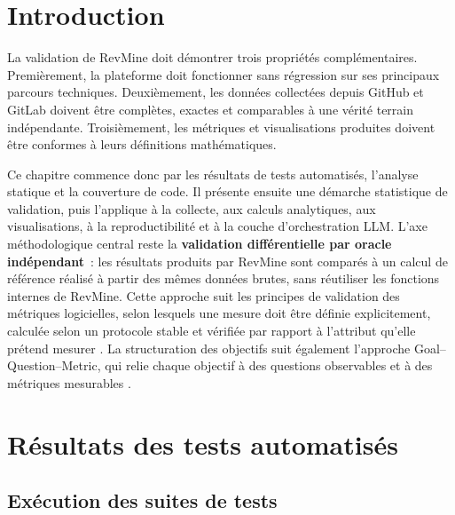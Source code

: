 

\section{Introduction}
\label{sec:validation-introduction}

La validation de RevMine doit démontrer trois propriétés complémentaires. Premièrement, la
plateforme doit fonctionner sans régression sur ses principaux parcours techniques. Deuxièmement,
les données collectées depuis GitHub et GitLab doivent être complètes, exactes et comparables à
une vérité terrain indépendante. Troisièmement, les métriques et visualisations produites doivent
être conformes à leurs définitions mathématiques.

Ce chapitre commence donc par les résultats de tests automatisés, l'analyse statique et la
couverture de code. Il présente ensuite une démarche statistique de validation, puis l'applique à
la collecte, aux calculs analytiques, aux visualisations, à la reproductibilité et à la couche
d'orchestration LLM. L'axe méthodologique central reste la \textbf{validation différentielle par
oracle indépendant}~: les résultats produits par RevMine sont comparés à un calcul de référence
réalisé à partir des mêmes données brutes, sans réutiliser les fonctions internes de RevMine. Cette
approche suit les principes de validation des métriques logicielles, selon lesquels une mesure doit
être définie explicitement, calculée selon un protocole stable et vérifiée par rapport à l'attribut
qu'elle prétend mesurer \cite{fenton2014software,kitchenham1995framework}. La structuration des
objectifs suit également l'approche Goal--Question--Metric, qui relie chaque objectif à des
questions observables et à des métriques mesurables \cite{basili1994gqm}.

\section{Résultats des tests automatisés}
\label{sec:resultats-tests-automatises}

\subsection{Exécution des suites de tests}

